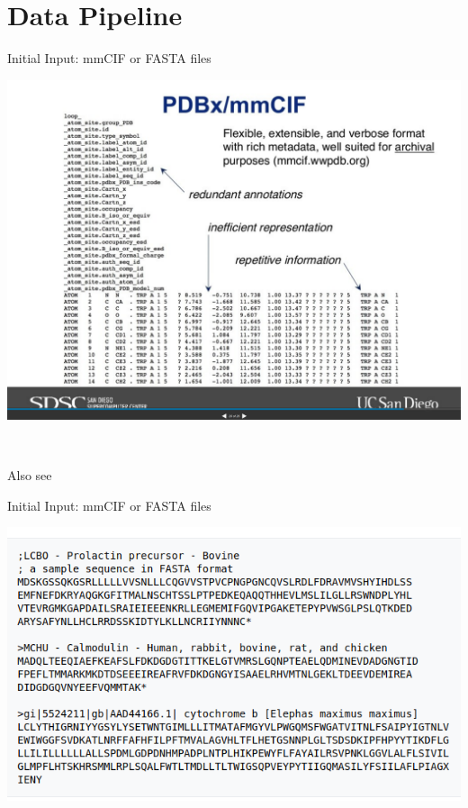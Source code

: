 \documentclass[presentation, smaller]{beamer}
\begin{document}
\section*{Data Pipeline}
\label{sec:orgd17a124}
\begin{frame}[label={sec:org5532c53}]{Initial Input: mmCIF or FASTA files}
\begin{center}
\includegraphics[height=.8\textheight]{./imgs/mmcif-eg.png}
\end{center}~\cite{jumperHighlyAccurateProtein2021}

Also see~\cite{PDB101LearnGuide}
\end{frame}

\begin{frame}[label={sec:orgae2d480}]{Initial Input: mmCIF or FASTA files}
\begin{center}
\includegraphics[width=.9\linewidth]{./imgs/fastafiles_2021-07-20.png}
\end{center}~\cite{jumperHighlyAccurateProtein2021}
\end{frame}
\end{document}
